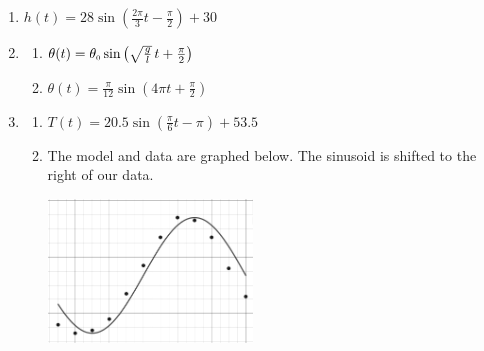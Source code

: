 \documentclass{ximera}
\begin{document}
\begin{enumerate}
\setcounter{enumi}{\value{HW}}





\item  $h(t) = 28\sin\left(\frac{2\pi}{3} t - \frac{\pi}{2}\right) + 30$


\item  \begin{multicols}{2}

\begin{enumerate}

\item  $\theta(t) = \theta_{\text{\tiny $0$}} \sin\left(\sqrt{\frac{g}{l}}\, t + \frac{\pi}{2}\right)$

\item  $\theta(t) = \frac{\pi}{12} \sin\left(4\pi t + \frac{\pi}{2}\right)$
\end{enumerate}
\end{multicols}

\item  \begin{enumerate} \item  $T(t) = 20.5 \sin\left(\frac{\pi}{6} t - \pi\right) + 53.5$ 

\item  The model and data are graphed below.  The sinusoid is shifted to the right of our data.

\begin{center}

 \includegraphics[height=1.5in]{./GraphsofSineandCosineGraphics/LakeErieTempReg.jpg} 


\end{center}
\end{enumerate}
\end{enumerate}
\end{document}
